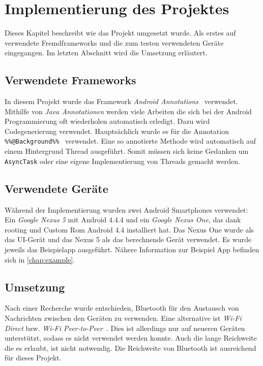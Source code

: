 \chapter{Implementierung des Projektes}\label{chap:impl}
%
Dieses Kapitel beschreibt wie das Projekt umgesetzt wurde. Als erstes auf verwendete Fremdframeworks und die zum testen verwendeten Geräte eingegangen. Im letzten Abschnitt wird die Umsetzung erläutert.
%
\section{Verwendete Frameworks}
%
In diesem Projekt wurde das Framework \emph{Android Annotations}~\cite{Ricau2015} verwendet. Mithilfe von \emph{Java Annotationen} werden viele Arbeiten die sich bei der Android Programmierung oft wiederholen automatisch erledigt. Dazu wird Codegenerierung verwendet. Hauptsächlich wurde es für die Annotation \lstinline|%%@Background%%|~\cite{Ricau2015a} verwendet. Eine so annotierte Methode wird automatisch auf einem Hintergrund Thread ausgeführt. Somit müssen sich keine Gedanken um \lstinline|AsyncTask| oder eine eigene Implementierung von Threads gemacht werden.
%
\section{Verwendete Geräte}
%
Während der Implementierung wurden zwei Android Smartphones verwendet: Ein \emph{Google Nexus 5} mit Android 4.4.4 und ein \emph{Google Nexus One}, das dank rooting und Custom Rom Android 4.4 installiert hat. Das Nexus One wurde als das UI-Gerät und das Nexus 5 als das berechnende Gerät verwendet. Es wurde jeweils das Beispielapp ausgeführt. Nähere Information zur Beispiel App befinden sich in \autoref{chap:example}.
%
\section{Umsetzung}
%
Nach einer Recherche wurde entschieden, Bluetooth für den Austausch von Nachrichten zwischen den Geräten zu verwenden. Eine alternative ist \emph{Wi-Fi Direct} bzw. \emph{Wi-Fi Peer-to-Peer}~\cite{GoogleInc.2015}. Dies ist allerdings nur auf neueren Geräten unterstützt, sodass es nicht verwendet werden konnte. Auch die lange Reichweite die es erlaubt, ist nicht notwendig. Die Reichweite von Bluetooth ist ausreichend für dieses Projekt.

